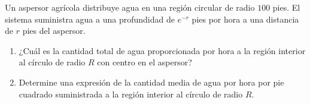 \item Un aspersor agrícola distribuye agua en una región circular de radio $100$ pies. El sistema suministra agua a una profundidad de $e^{-r}$ pies por hora a una distancia de $r$ pies del aspersor.
    \begin{enumerate}
        \item[(a)] ¿Cuál es la cantidad total de agua proporcionada por hora a la región interior al círculo de radio $R$ con centro en el aspersor?
        \item[(b)] Determine una expresión de la cantidad media de agua por hora por pie cuadrado suministrada a la región interior al círculo de radio $R$.
    \end{enumerate}

    \begin{center}
    \end{center}
